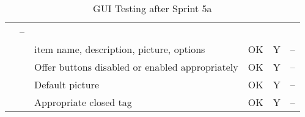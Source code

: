 \begin{sidewaystable}
\begin{tabularx}{\textwidth}{cbbbcb}
    		& --\\
    		\cline{3-6} \noalign{\smallskip}
    		&& item name, description, picture, options
    		& OK
    		& Y
    		& --\\
    		\cline{3-6} \noalign{\smallskip}
    		&& Offer buttons disabled or enabled appropriately
    		& OK
    		& Y
    		& --\\
    		\cline{3-6} \noalign{\smallskip}
    		&& Default picture
    		& OK
    		& Y
    		& --\\
    		\cline{3-6} \noalign{\smallskip}
    		&& Appropriate closed tag
    		& OK
    		& Y
    		& --\\
    \bottomrule
    \end{tabularx}
    \caption{GUI Testing after Sprint 5a}
    \label{table:gui-test1}
\end{sidewaystable}

